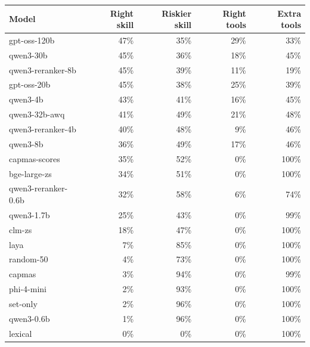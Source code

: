 \begin{tabular}{lrrrr}
\toprule
Model & Right skill & Riskier skill & Right tools & Extra tools \\
\midrule
gpt-oss-120b & 47\% & 35\% & 29\% & 33\% \\
qwen3-30b & 45\% & 36\% & 18\% & 45\% \\
qwen3-reranker-8b & 45\% & 39\% & 11\% & 19\% \\
gpt-oss-20b & 45\% & 38\% & 25\% & 39\% \\
qwen3-4b & 43\% & 41\% & 16\% & 45\% \\
qwen3-32b-awq & 41\% & 49\% & 21\% & 48\% \\
qwen3-reranker-4b & 40\% & 48\% & 9\% & 46\% \\
qwen3-8b & 36\% & 49\% & 17\% & 46\% \\
capmas-scores & 35\% & 52\% & 0\% & 100\% \\
bge-large-zs & 34\% & 51\% & 0\% & 100\% \\
qwen3-reranker-0.6b & 32\% & 58\% & 6\% & 74\% \\
qwen3-1.7b & 25\% & 43\% & 0\% & 99\% \\
clm-zs & 18\% & 47\% & 0\% & 100\% \\
laya & 7\% & 85\% & 0\% & 100\% \\
random-50 & 4\% & 73\% & 0\% & 100\% \\
capmas & 3\% & 94\% & 0\% & 99\% \\
phi-4-mini & 2\% & 93\% & 0\% & 100\% \\
set-only & 2\% & 96\% & 0\% & 100\% \\
qwen3-0.6b & 1\% & 96\% & 0\% & 100\% \\
lexical & 0\% & 0\% & 0\% & 100\% \\
\bottomrule
\end{tabular}
